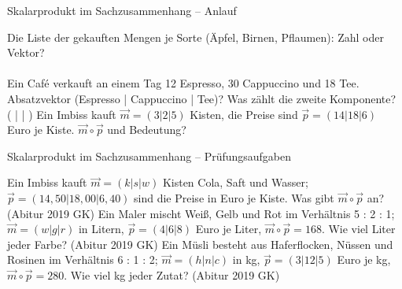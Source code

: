 \begin{aufgabe}{Skalarprodukt im Sachzusammenhang – Anlauf}
\begin{teile}
\teil Die Liste der gekauften Mengen je Sorte (Äpfel, Birnen, Pflaumen): Zahl oder Vektor? \\  \\ 
\teil Ein Café verkauft an einem Tag 12 Espresso, 30 Cappuccino und 18 Tee. Absatzvektor (Espresso | Cappuccino | Tee)? Was zählt die zweite Komponente? ( \leerfeld | \leerfeld | \leerfeld )
\teil Ein Imbiss kauft $\vec m = (3 | 2 | 5)$ Kisten, die Preise sind $\vec p = (14 | 18 | 6)$ Euro je Kiste. $\vec m \circ \vec p$ und Bedeutung?
\end{teile}
\end{aufgabe}

\begin{aufgabe}{Skalarprodukt im Sachzusammenhang – Prüfungsaufgaben}
\begin{teile}
\teil Ein Imbiss kauft $\vec m = (k | s | w)$ Kisten Cola, Saft und Wasser; $\vec p = (14{,}50 | 18{,}00 | 6{,}40)$ sind die Preise in Euro je Kiste. Was gibt $\vec m \circ \vec p$ an? \hfill (Abitur 2019 GK)
\teil Ein Maler mischt Weiß, Gelb und Rot im Verhältnis 5 : 2 : 1; $\vec m = (w | g | r)$ in Litern, $\vec p = (4 | 6 | 8)$ Euro je Liter, $\vec m \circ \vec p = 168$. Wie viel Liter jeder Farbe? \hfill (Abitur 2019 GK)
\teil Ein Müsli besteht aus Haferflocken, Nüssen und Rosinen im Verhältnis 6 : 1 : 2; $\vec m = (h | n | c)$ in kg, $\vec p = (3 | 12 | 5)$ Euro je kg, $\vec m \circ \vec p = 280$. Wie viel kg jeder Zutat? \hfill (Abitur 2019 GK)
\end{teile}
\end{aufgabe}
